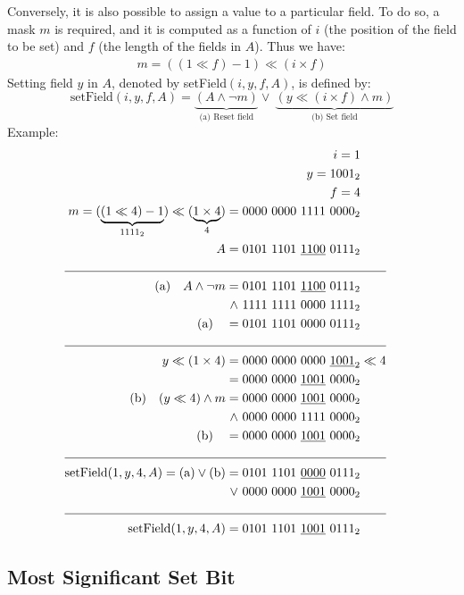 Conversely, it is also possible to assign a value to a particular field. To do so, a mask $m$ is required, and it is computed as a function of $i$ (the position of the field to be set) and $f$ (the length of the fields in $A$). Thus we have:
\begin{align*}
    m = ((1 \ll f) - 1) \ll (i \times f)
\end{align*}
 Setting field $y$ in $A$, denoted by setField$(i, y, f, A)$, is defined by:
\begin{equation*}
    \text{setField}(i, y, f, A) = \underbrace{(A \wedge \neg m)}_{\text{(a) Reset field}} \vee \ \underbrace{(y \ll (i \times f) \wedge m)}_{\text{(b) Set field}}
\end{equation*}
Example:
\begin{align*}
    i = 1\\
    y = 1001_2\\
    f = 4\\
    m = (\underbrace{(1 \ll 4)  - 1} _{1111_2}) \ll (\underbrace{1 \times 4}_{4}) = 0000\ 0000\ 1111\ 0000_2\\
    A = 0101\ 1101\ \underline{1100}\ 0111_2& \\
    \cline{1-2}
    \text{(a)}\quad A \wedge \neg m = 0101\ 1101\ \underline{1100}\ 0111_2 \\
    \wedge\ 1111\ 1111\ 0000\ 1111_2\\
    \text{(a)}\quad = 0101\ 1101\ 0000\ 0111_2\\
    \cline{1-2}
    y \ll (1 \times 4) = 0000\ 0000\ 0000\ \underline{1001}_2& \ll 4\\
    = 0000\ 0000\ \underline{1001}\ 0000_2\\
    \text{(b)}\quad (y \ll 4) \wedge m = 0000\ 0000\ \underline{1001}\ 0000_2\\ 
    \wedge\ 0000\ 0000\ 1111\ 0000_2\\
    \text{(b)}\quad = 0000\ 0000\ \underline{1001}\ 0000_2\\
    \cline{1-2}
    \text{setField}(1, y, 4, A) = \text{(a)} \vee \text{(b)} = 0101\ 1101\ \underline{0000}\ 0111_2\\
    \vee\ 0000\ 0000\ \underline{1001}\ 0000_2 \\
    \cline{1-2}
    \text{setField}(1, y, 4, A) = 0101\ 1101\ \underline{1001}\ 0111_2&
\end{align*}

\newpage
\subsection{Most Significant Set Bit} \label{sec:msbAlgorithm}

